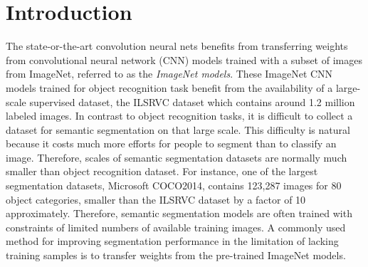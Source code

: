 \section{Introduction}
\label{introduction}



The state-or-the-art convolution neural nets benefits from transferring weights from convolutional neural network (CNN) models trained with a subset of images from ImageNet, referred to as the \textit{ImageNet models}.\cite{long2015fully,chen2016deeplab,he2017mask}
These ImageNet CNN models\cite{krizhevsky2012imagenet,simonyan2014very,szegedy2015going,he2016deep} trained for object recognition task benefit from the availability of a large-scale supervised dataset, the ILSRVC dataset\cite{russakovsky2015imagenet} which contains around 1.2 million labeled images.
In contrast to object recognition tasks, it is difficult to collect a dataset for semantic segmentation on that large scale.
This difficulty is natural because it costs much more efforts for people to segment than to classify an image.
Therefore, scales of semantic segmentation datasets are normally much smaller than object recognition dataset.
For instance, one of the largest segmentation datasets, Microsoft COCO2014\cite{lin2014microsoft}, contains 123,287 images for 80 object categories, smaller than the ILSRVC dataset by a factor of 10 approximately.
Therefore, semantic segmentation models are often trained with constraints of limited numbers of available training images.
A commonly used method for improving segmentation performance in the limitation of lacking training samples is to transfer weights from the pre-trained ImageNet models.\cite{long2015fully,chen2016deeplab}


